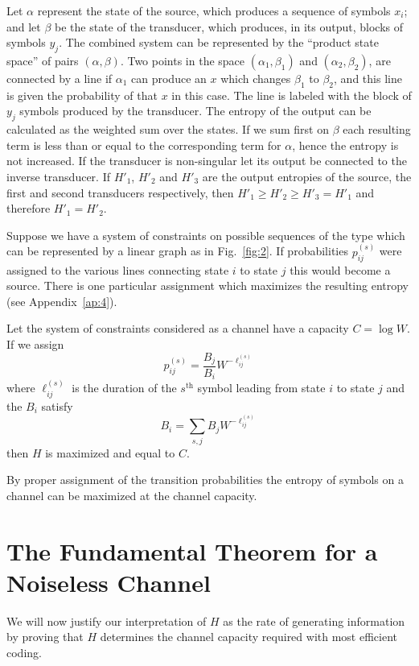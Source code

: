 Let $\alpha$ represent the state of the source, which produces a
sequence of symbols $x_i$; and let $\beta$ be the state of the transducer,
which produces, in its output, blocks of symbols $y_j$.  The combined system
can be represented by the ``product state space'' of pairs $(\alpha,\beta)$.
Two points in the space $(\alpha_1,\beta_1 )$ and $(\alpha_2,\beta_2 )$,
are connected by a line if $\alpha_1$ can produce an $x$ which changes
$\beta_1$ to $\beta_2$, and this line is given the probability of that
$x$ in this case.  The line is labeled with the block of $y_j$ symbols
produced by the transducer.  The entropy of the output can be calculated
as the weighted sum over the states.  If we sum first on $\beta$ each
resulting term is less than or equal to the corresponding term for
$\alpha$, hence the entropy is not increased.  If the transducer is
non-singular let its output be connected to the inverse transducer.
If $H'_1$, $H'_2$ and $H'_3$ are the output entropies of the source,
the first and second transducers respectively, then $H'_1 \ge H'_2 \ge
H'_3 = H'_1$ and therefore $H'_1 = H'_2$.

Suppose we have a system of constraints on possible sequences of the
type which can be represented by a linear graph as in Fig.~\ref{fig:2}.
If probabilities $p_{ij}^{(s)}$ were assigned to the various lines
connecting state $i$ to state $j$ this would become a source.  There is
one particular assignment which maximizes the resulting entropy (see
Appendix~\ref{ap:4}).

\begin{theorem}
\label{thm:8}
Let the system of constraints considered as a channel have a capacity
$C=\log W$.  If we assign
$$
p_{ij}^{(s)} = \frac{B_j}{B_i}
W^{-\ell_{ij}^{(s)}}
$$
where $\ell_{ij}^{(s)}$ is the duration of the $s^{\text{th}}$ symbol leading
from state $i$ to state $j$ and the $B_i$ satisfy
$$
B_i = \sum_{s,j} B_j
W^{-\ell_{ij}^{(s)}}
$$
then $H$ is maximized and equal to $C$.
\end{theorem}

By proper assignment of the transition probabilities the entropy of
symbols on a channel can be maximized at the channel capacity.

\section{The Fundamental Theorem for a Noiseless Channel}

We will now justify our interpretation of $H$ as the rate of generating
information by proving that $H$ determines the channel capacity required
with most efficient coding.

